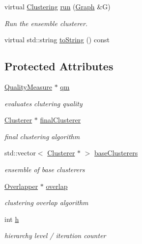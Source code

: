 \begin{DoxyCompactItemize}
virtual \hyperlink{class_ensemble_clustering_1_1_clustering}{Clustering} \hyperlink{class_ensemble_clustering_1_1_ensemble_multilevel_adc1557bf71810a5fc7f37400917f407e}{run} (\hyperlink{class_ensemble_clustering_1_1_graph}{Graph} \&G)
\begin{DoxyCompactList}\small\item\em Run the ensemble clusterer. \end{DoxyCompactList}\item 
virtual std\-::string \hyperlink{class_ensemble_clustering_1_1_ensemble_multilevel_a18d80c7285dfbf236306908804e45af8}{to\-String} () const 
\end{DoxyCompactItemize}
\subsection*{Protected Attributes}
\begin{DoxyCompactItemize}
\item 
\hyperlink{class_ensemble_clustering_1_1_quality_measure}{Quality\-Measure} $\ast$ \hyperlink{class_ensemble_clustering_1_1_ensemble_multilevel_a15b2fa011c34bb8c2ea0125b22530eb0}{qm}
\begin{DoxyCompactList}\small\item\em evaluates clutering quality \end{DoxyCompactList}\item 
\hyperlink{class_ensemble_clustering_1_1_clusterer}{Clusterer} $\ast$ \hyperlink{class_ensemble_clustering_1_1_ensemble_multilevel_a8fd0edb77e73782397ee3abcd0ef7703}{final\-Clusterer}
\begin{DoxyCompactList}\small\item\em final clustering algorithm \end{DoxyCompactList}\item 
std\-::vector$<$ \hyperlink{class_ensemble_clustering_1_1_clusterer}{Clusterer} $\ast$ $>$ \hyperlink{class_ensemble_clustering_1_1_ensemble_multilevel_a3cfdea29f6d247ee855ce68ebfbd8945}{base\-Clusterers}
\begin{DoxyCompactList}\small\item\em ensemble of base clusterers \end{DoxyCompactList}\item 
\hyperlink{class_ensemble_clustering_1_1_overlapper}{Overlapper} $\ast$ \hyperlink{class_ensemble_clustering_1_1_ensemble_multilevel_a14fc679b06a378edbda2fe0b77c831b0}{overlap}
\begin{DoxyCompactList}\small\item\em clustering overlap algorithm \end{DoxyCompactList}\item 
int \hyperlink{class_ensemble_clustering_1_1_ensemble_multilevel_a326e7cca2b0f70d543c1b71fdb534ee6}{h}
\begin{DoxyCompactList}\small\item\em hierarchy level / iteration counter \end{DoxyCompactList}\end{DoxyCompactItemize}


